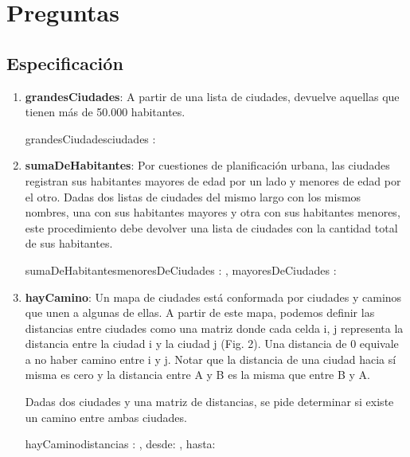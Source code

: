 \documentclass[10pt,a4paper]{article}
\begin{document}
\maketitle

\section{Preguntas}
\subsection{Especificaci\'on}


    \begin{enumerate}
        \item \textbf{grandesCiudades}: A partir de una lista de ciudades, devuelve aquellas que tienen m\'as de 50.000 habitantes.
        \begin{proc}{grandesCiudades}{\In ciudades : } {}\end{proc}

        \item \textbf{sumaDeHabitantes}: Por cuestiones de planificaci\'on urbana, las ciudades registran sus habitantes mayores de edad
        por un lado y menores de edad por el otro. Dadas dos listas de ciudades del mismo largo con los mismos nombres, una
        con sus habitantes mayores y otra con sus habitantes menores, este procedimiento debe devolver una lista de ciudades
        con la cantidad total de sus habitantes.

        \begin{proc}{sumaDeHabitantes}{\In menoresDeCiudades : , \In mayoresDeCiudades : }{}\end{proc}

        \item \textbf{hayCamino}: Un mapa de ciudades est\'a conformada por ciudades y caminos que unen a algunas de ellas. A partir de
        este mapa, podemos definir las distancias entre ciudades como una matriz donde cada celda i, j representa la distancia
        entre la ciudad i y la ciudad j (Fig. 2). Una distancia de 0 equivale a no haber camino entre i y j. Notar que la distancia
        de una ciudad hacia s\'i misma es cero y la distancia entre A y B es la misma que entre B y A.


        Dadas dos ciudades y una matriz de distancias, se pide determinar si existe un camino entre ambas ciudades.

        \begin{proc}{hayCamino}{\In distancias : \TLista{\TLista{\ent}}, \In desde: \ent, \In hasta: \ent}{\bool}\end{proc}


\end{enumerate}
\end{document}
